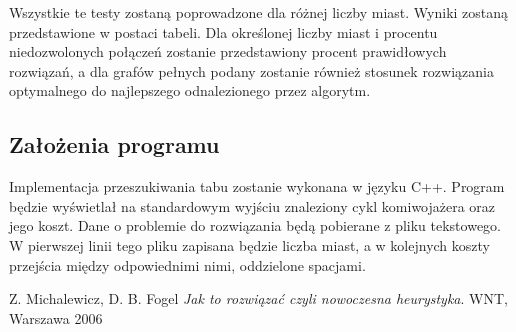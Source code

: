\documentclass[11pt,a4paper,twoside]{article}
\begin{document}
Wszystkie te testy zostaną poprowadzone dla różnej liczby miast. Wyniki zostaną przedstawione w postaci tabeli. Dla określonej liczby miast i procentu niedozwolonych połączeń zostanie przedstawiony procent prawidłowych rozwiązań, a dla grafów pełnych podany zostanie również stosunek rozwiązania optymalnego do najlepszego odnalezionego przez algorytm. 
\subsection{Założenia programu}
Implementacja przeszukiwania tabu zostanie wykonana w języku C++. Program będzie wyświetlał na standardowym wyjściu znaleziony cykl komiwojażera oraz jego koszt. Dane o problemie do rozwiązania będą pobierane z pliku tekstowego. W pierwszej linii tego pliku zapisana będzie liczba miast, a w kolejnych koszty przejścia między odpowiednimi nimi, oddzielone spacjami.
  
\begin{thebibliography}{9}
Z. Michalewicz, D. B. Fogel
\emph{Jak to rozwiązać czyli nowoczesna heurystyka}.
WNT, Warszawa 2006
\end{thebibliography}
\end{document}

